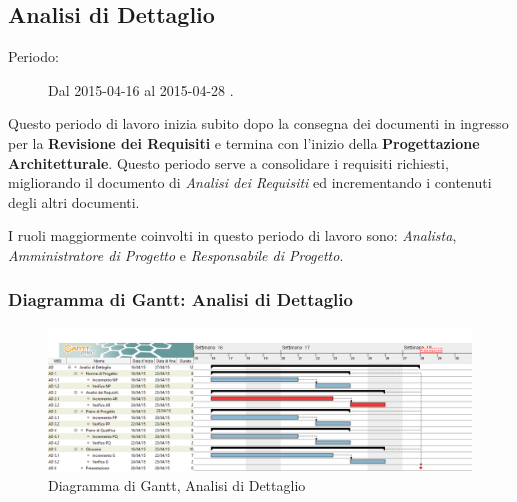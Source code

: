 \newpage
\subsection{Analisi di Dettaglio}
\begin{description}
	\item[Periodo:] Dal 2015-04-16 al 2015-04-28 .
\end{description}
Questo periodo di lavoro inizia subito dopo la consegna dei documenti in ingresso per la \textbf{Revisione dei Requisiti} e termina con l'inizio della \textbf{Progettazione Architetturale}. Questo periodo serve a consolidare i requisiti richiesti, migliorando il documento di \textit{Analisi dei Requisiti} ed incrementando i contenuti degli altri documenti. 

\noindent I ruoli maggiormente coinvolti in questo periodo di lavoro sono: \textit{Analista}, \textit{Amministratore di Progetto} e \textit{Responsabile di Progetto}.
\subsubsection{Diagramma di Gantt: Analisi di Dettaglio}
\begin{figure}[h]
\centering
\includegraphics[width=\textwidth]{./img/analisi_dettaglio.png}
\caption{Diagramma di Gantt, Analisi di Dettaglio}
\label{fig2}
\end{figure}

\newpage
